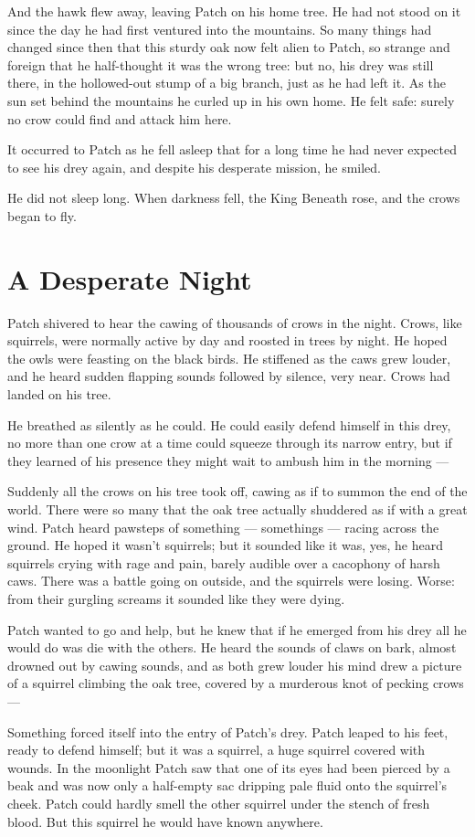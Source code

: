 \documentclass[ebook,oneside,openany,17pt]{memoir}
\renewcommand{\thechapter}{\Roman{chapter}}
\newcounter{sections}
\newcommand{\sections}[1]{%
  \section*{#1}
  \addtocounter{sections}{1}%
  \pdfbookmark[1]{#1}{section.\thechapter.\thesections}}
\begin{document}
And the hawk flew away, leaving Patch on his home tree. He had not
stood on it since the day he had first ventured into the mountains. So
many things had changed since then that this sturdy oak now felt alien
to Patch, so strange and foreign that he half-thought it was the wrong
tree: but no, his drey was still there, in the hollowed-out stump of a
big branch, just as he had left it. As the sun set behind the
mountains he curled up in his own home. He felt safe: surely no crow
could find and attack him here.

It occurred to Patch as he fell asleep that for a long time he had
never expected to see his drey again, and despite his desperate
mission, he smiled.

He did not sleep long. When darkness fell, the King Beneath rose, and
the crows began to fly.


\sections{A Desperate Night}

Patch shivered to hear the cawing of thousands of crows in the
night. Crows, like squirrels, were normally active by day and roosted
in trees by night. He hoped the owls were feasting on the black
birds. He stiffened as the caws grew louder, and he heard sudden
flapping sounds followed by silence, very near. Crows had landed on
his tree.

He breathed as silently as he could. He could easily defend himself in
this drey, no more than one crow at a time could squeeze through its
narrow entry, but if they learned of his presence they might wait to
ambush him in the morning —

Suddenly all the crows on his tree took off, cawing as if to summon
the end of the world. There were so many that the oak tree actually
shuddered as if with a great wind. Patch heard pawsteps of something —
somethings — racing across the ground. He hoped it wasn’t squirrels;
but it sounded like it was, yes, he heard squirrels crying with rage
and pain, barely audible over a cacophony of harsh caws. There was a
battle going on outside, and the squirrels were losing. Worse: from
their gurgling screams it sounded like they were dying.

Patch wanted to go and help, but he knew that if he emerged from his
drey all he would do was die with the others. He heard the sounds of
claws on bark, almost drowned out by cawing sounds, and as both grew
louder his mind drew a picture of a squirrel climbing the oak tree,
covered by a murderous knot of pecking crows —

Something forced itself into the entry of Patch’s drey. Patch leaped
to his feet, ready to defend himself; but it was a squirrel, a huge
squirrel covered with wounds. In the moonlight Patch saw that one of
its eyes had been pierced by a beak and was now only a half-empty sac
dripping pale fluid onto the squirrel’s cheek. Patch could hardly
smell the other squirrel under the stench of fresh blood. But this
squirrel he would have known anywhere.
\end{document}
